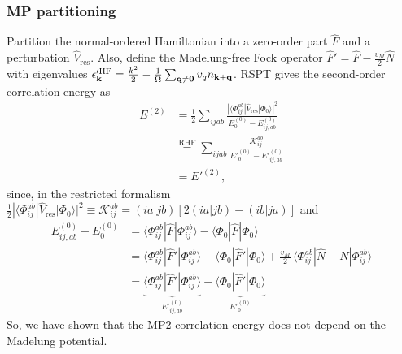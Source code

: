 \subsubsection{MP partitioning}
Partition the normal-ordered Hamiltonian into a zero-order part $\hat F$ and a perturbation $\hat V_{\mathrm{res}}$. Also, define the Madelung-free Fock operator $\hat F'=\hat F-\frac{v_M}{2}\hat N$ with eigenvalues $\epsilon'^{\rm HF}_{\mathbf k} = \frac{k^2}{2}-\frac{1}{\Omega}\sum_{\mathbf q\neq\mathbf 0}v_q n_{\mathbf{k}+\mathbf q}$. RSPT gives the second-order correlation energy as
\begin{align}
  E^{(2)}&=\frac{1}{2}\sum_{ijab}
  \frac{|\langle\Phi_{ij}^{ab}|\hat V_{\mathrm{res}}|\Phi_0\rangle|^2}{E^{(0)}_0-E^{(0)}_{ij,ab}}\\
&\overset{\text{RHF}}{=} \sum_{ijab}
  \frac{\mathcal K_{ij}^{ab}}{E'^{(0)}_0-E'^{(0)}_{ij,ab}}\\
&= E'^{(2)},
\end{align}
since, in the restricted formalism $\frac{1}{2}|\langle\Phi_{ij}^{ab}|\hat V_{\mathrm{res}}|\Phi_0\rangle|^2 \equiv \mathcal K_{ij}^{ab} =
(ia|jb)
\left[
2(ia|jb)-(ib|ja)
\right]$ and
\begin{align}
  E^{(0)}_{ij,ab}-E^{(0)}_0
  &=\langle\Phi_{ij}^{ab}|\hat F|\Phi_{ij}^{ab}\rangle-\langle\Phi_0|\hat F|\Phi_0\rangle
\\
  &=\langle\Phi_{ij}^{ab}|\hat F'|\Phi_{ij}^{ab}\rangle-\langle\Phi_0|\hat F'|\Phi_0\rangle
   +\frac{v_M}{2}\,\langle\Phi_{ij}^{ab}|\hat N-N|\Phi_{ij}^{ab}\rangle
\\
&= \underbrace{\langle\Phi_{ij}^{ab}|\hat F'|\Phi_{ij}^{ab}\rangle}_{E'^{(0)}_{ij,ab}}-\underbrace{\langle\Phi_0|\hat F'|\Phi_0\rangle}_{E'^{(0)}_0}
  \label{eq:mp2denom}
\end{align}
So, we have shown that the MP2 correlation energy does not depend on the Madelung potential.
